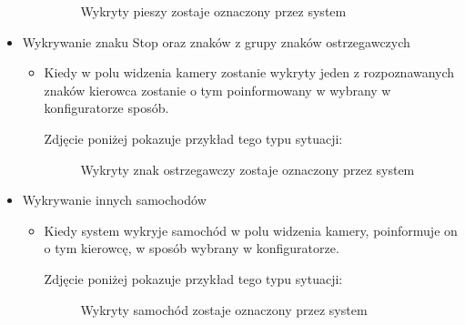 \begin{itemize}
\begin{itemize}
		\begin{figure}[H]
			\centering
       		\caption{Wykryty pieszy zostaje oznaczony przez system}
			\label{fig:pieszy}
		\end{figure}
	\end{itemize}
	
	\newpage
	
	\item Wykrywanie znaku Stop oraz znaków z grupy znaków ostrzegawczych
	\begin{itemize}
		\item Kiedy w polu widzenia kamery zostanie wykryty jeden z rozpoznawanych znaków kierowca zostanie o tym poinformowany w wybrany w konfiguratorze sposób.
		
		\begin{center}
			Zdjęcie poniżej pokazuje przykład tego typu sytuacji:
		\end{center}
		
		\begin{figure}[H]
			\centering
			\caption{Wykryty znak ostrzegawczy zostaje oznaczony przez system}
			\label{fig:znak}
		\end{figure}
		
	\end{itemize}
	
	\newpage
	
	\item Wykrywanie innych samochodów
	\begin{itemize}
		\item Kiedy system wykryje samochód w polu widzenia kamery, poinformuje on o tym kierowcę, w sposób wybrany w konfiguratorze.
		
		\begin{center}
			Zdjęcie poniżej pokazuje przykład tego typu sytuacji:
		\end{center}
		
		\begin{figure}[H]
			\centering
			\caption{Wykryty samochód zostaje oznaczony przez system}
			\label{fig:samochod}
		\end{figure}
		
	\end{itemize}
\end{itemize}
  

  
